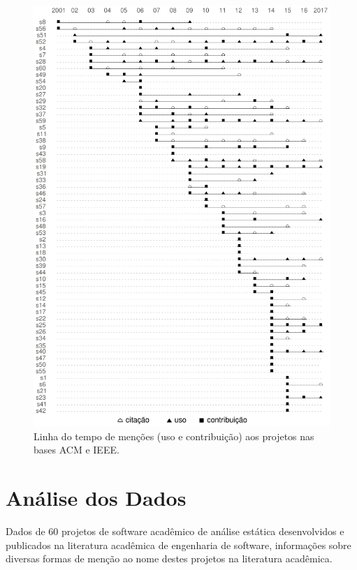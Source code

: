 \begin{figure}[h]
  \center
  \includegraphics[scale=0.6]{imagens/mentions-timeline.png}
  \caption{Linha do tempo de menções (uso e contribuição) aos projetos nas bases ACM e IEEE.}
  \label{mentions-timeline}
\end{figure}


\section{Análise dos Dados} \label{estudo2:analise} %

Dados de 60 projetos de software acadêmico de análise estática desenvolvidos e
publicados na literatura acadêmica de engenharia de software, informações sobre
diversas formas de menção ao nome destes projetos na literatura acadêmica.


